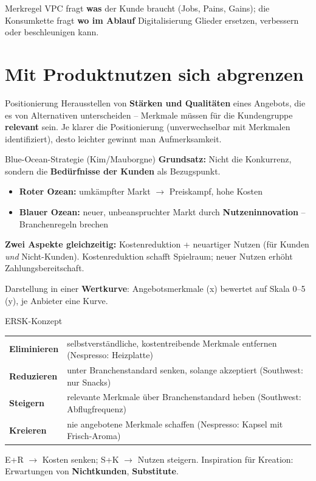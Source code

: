 \documentclass[a4paper, fontsize=7pt]{scrartcl}
\renewcommand*{\arraystretch}{1.5}  %
\begin{document}
\begin{subbox}{Merkregel}
VPC fragt \textbf{was} der Kunde braucht (Jobs, Pains, Gains); die
Konsumkette fragt \textbf{wo im Ablauf} Digitalisierung Glieder ersetzen,
verbessern oder beschleunigen kann.
\end{subbox}

\section{Mit Produktnutzen sich abgrenzen}

\begin{mainbox}{Positionierung}
Herausstellen von \textbf{Stärken und Qualitäten} eines Angebots, die es von
Alternativen unterscheiden -- Merkmale müssen für die Kundengruppe
\textbf{relevant} sein. Je klarer die Positionierung (unverwechselbar mit
Merkmalen identifiziert), desto leichter gewinnt man Aufmerksamkeit.
\end{mainbox}

\begin{mainbox}{Blue-Ocean-Strategie (Kim/Mauborgne)}
\textbf{Grundsatz:} Nicht die Konkurrenz, sondern die \textbf{Bedürfnisse der
Kunden} als Bezugspunkt.
\begin{itemize}
    \item \textbf{Roter Ozean:} umkämpfter Markt $\to$ Preiskampf, hohe Kosten
    \item \textbf{Blauer Ozean:} neuer, unbeanspruchter Markt durch
    \textbf{Nutzeninnovation} -- Branchenregeln brechen
\end{itemize}
\textbf{Zwei Aspekte gleichzeitig:} Kostenreduktion + neuartiger Nutzen (für
Kunden \emph{und} Nicht-Kunden). Kostenreduktion schafft Spielraum; neuer
Nutzen erhöht Zahlungsbereitschaft.

Darstellung in einer \textbf{Wertkurve}: Angebotsmerkmale (x) bewertet auf
Skala 0--5 (y), je Anbieter eine Kurve.
\end{mainbox}

\begin{mainbox}{ERSK-Konzept}
\renewcommand*{\arraystretch}{1.2}
\begin{tabularx}{\linewidth}{@{}lX@{}}
\textbf{Eliminieren} & selbstverständliche, kostentreibende Merkmale
entfernen (Nespresso: Heizplatte) \\
\textbf{Reduzieren} & unter Branchenstandard senken, solange akzeptiert
(Southwest: nur Snacks) \\
\textbf{Steigern} & relevante Merkmale über Branchenstandard heben
(Southwest: Abflugfrequenz) \\
\textbf{Kreieren} & nie angebotene Merkmale schaffen (Nespresso: Kapsel mit
Frisch-Aroma) \\
\end{tabularx}
E+R $\to$ Kosten senken; S+K $\to$ Nutzen steigern. Inspiration für Kreation:
Erwartungen von \textbf{Nichtkunden}, \textbf{Substitute}.
\end{mainbox}
\end{document}
